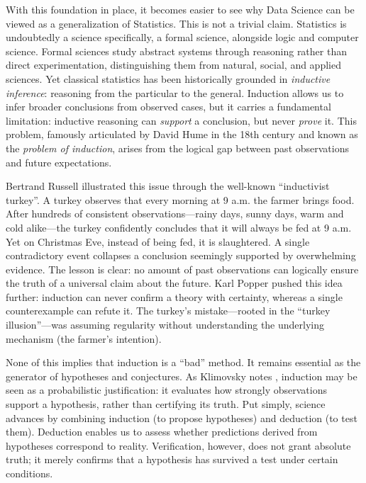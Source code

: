 \documentclass[
  12pt,
  letterpaper,
]{book}
\begin{document}
With this foundation in place, it becomes easier to see why Data Science
can be viewed as a generalization of Statistics. This is not a trivial
claim. Statistics is undoubtedly a science specifically, a formal
science, alongside logic and computer science. Formal sciences study
abstract systems through reasoning rather than direct experimentation,
distinguishing them from natural, social, and applied sciences. Yet
classical statistics has been historically grounded in \emph{inductive
inference}: reasoning from the particular to the general. Induction
allows us to infer broader conclusions from observed cases, but it
carries a fundamental limitation: inductive reasoning can \emph{support}
a conclusion, but never \emph{prove} it. This problem, famously
articulated by David Hume in the 18th century and known as the
\emph{problem of induction}, arises from the logical gap between past
observations and future expectations.

Bertrand Russell illustrated this issue through the well-known
``inductivist turkey''. A turkey observes that every morning at 9 a.m.
the farmer brings food. After hundreds of consistent
observations---rainy days, sunny days, warm and cold alike---the turkey
confidently concludes that it will always be fed at 9 a.m. Yet on
Christmas Eve, instead of being fed, it is slaughtered. A single
contradictory event collapses a conclusion seemingly supported by
overwhelming evidence. The lesson is clear: no amount of past
observations can logically ensure the truth of a universal claim about
the future. Karl Popper pushed this idea further: induction can never
confirm a theory with certainty, whereas a single counterexample can
refute it. The turkey's mistake---rooted in the ``turkey
illusion''---was assuming regularity without understanding the
underlying mechanism (the farmer's intention).

None of this implies that induction is a ``bad'' method. It remains
essential as the generator of hypotheses and conjectures. As Klimovsky
notes , induction may
be seen as a probabilistic justification: it evaluates how strongly
observations support a hypothesis, rather than certifying its truth. Put
simply, science advances by combining induction (to propose hypotheses)
and deduction (to test them). Deduction enables us to assess whether
predictions derived from hypotheses correspond to reality. Verification,
however, does not grant absolute truth; it merely confirms that a
hypothesis has survived a test under certain conditions.
\end{document}

